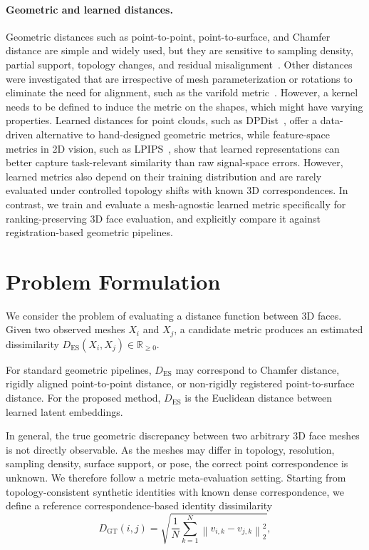 \documentclass[10pt,twocolumn,letterpaper]{article}
\begin{document}
\paragraph{Geometric and learned distances.}
Geometric distances such as point-to-point, point-to-surface, and Chamfer distance are simple and widely used, but they are sensitive to sampling density, partial support, topology changes, and residual misalignment~\cite{achlioptas2018learning,nguyen2021point}. Other distances were investigated that are irrespective of mesh parameterization or rotations to eliminate the need for alignment, such as the varifold metric~\cite{kaltenmark2017general, pierson20223d}. However, a kernel needs to be defined to induce the metric on the shapes, which might have varying properties. Learned distances for point clouds, such as DPDist~\cite{urbach2020dpdist}, offer a data-driven alternative to hand-designed geometric metrics, while feature-space metrics in 2D vision, such as LPIPS~\cite{lpips}, show that learned representations can better capture task-relevant similarity than raw signal-space errors. However, learned metrics also depend on their training distribution and are rarely evaluated under controlled topology shifts with known 3D correspondences. In contrast, we train and evaluate a mesh-agnostic learned metric specifically for ranking-preserving 3D face evaluation, and explicitly compare it against registration-based geometric pipelines.

\section{Problem Formulation}
\label{sec:problem_formulation}
We consider the problem of evaluating a distance function between 3D faces.
Given two observed meshes $X_i$ and $X_j$, a candidate metric produces an estimated dissimilarity
%
$D_{\mathrm{ES}}(X_i,X_j) \in \mathbb{R}_{\ge 0}$.

For standard geometric pipelines, $D_{\mathrm{ES}}$ may correspond to Chamfer distance, rigidly aligned point-to-point distance, or non-rigidly registered point-to-surface distance. For the proposed method, $D_{\mathrm{ES}}$ is the Euclidean distance between learned latent embeddings.

In general, the true geometric discrepancy between two arbitrary 3D face meshes is not directly observable. As the meshes may differ in topology, resolution, sampling density, surface support, or pose, the correct point correspondence is unknown. We therefore follow a metric meta-evaluation setting. Starting from topology-consistent synthetic identities with known dense correspondence, we define a reference correspondence-based identity dissimilarity
%
\begin{equation}
D_{\mathrm{GT}}(i,j)
=
\sqrt{
\frac{1}{N}
\sum_{k=1}^{N}
\left\|
v_{i,k} - v_{j,k}
\right\|_2^2
}, 
\label{eq:ground_truth_distance}
\end{equation}
\end{document}
